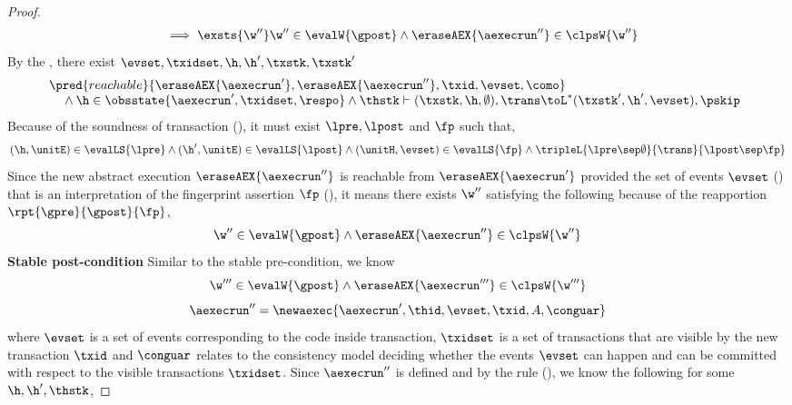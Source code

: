 \begin{proof}
\[\begin{array}{@{}l}
    \quad {} \implies \exsts{\w''} 
    \w'' \in \evalW{\gpost} 
    \land \eraseAEX{ \aexecrun'' } \in \clpsW{\w''}
\end{array}
\]
By the , there exist \( \evset,\txidset, \h, \h', \txstk, \txstk' \)
\begin{equation}
\label{equ:reachable}
\begin{array}{@{}l}
    \pred{reachable}{\eraseAEX{\aexecrun'}, \eraseAEX{\aexecrun''}, \txid, \evset, \como} \\
    \quad {} \land \h \in \obsstate{\aexecrun', \txidset, \respo} \land \thstk \vdash (\txstk, \h, \emptyset), \trans \toL^{*} (\txstk', \h', \evset ), \pskip
\end{array}
\end{equation}
Because of the soundness of transaction (), it must exist \( \lpre, \lpost \) and \( \fp \) such that,
\begin{equation}
\label{equ:local-transfer}
    (\h, \unitE) \in \evalLS{\lpre} 
    \land (\h', \unitE) \in \evalLS{\lpost} 
    \land (\unitH, \evset ) \in \evalLS{\fp}
    \land \tripleL{\lpre \sep \emptyset}{\trans}{\lpost \sep \fp}
\end{equation}
Since the new abstract execution \( \eraseAEX{\aexecrun''} \) is reachable from \( \eraseAEX{\aexecrun'} \) provided the set of events \( \evset \) () that is an interpretation of the fingerprint assertion \( \fp \) (), it means there exists \(  \w'' \) satisfying the following because of the reapportion  \( \rpt{ \gpre }{ \gpost }{ \fp }\),
\[
    \w'' \in \evalW{\gpost} 
    \land \eraseAEX{ \aexecrun'' } \in \clpsW{\w''}
\]
\textbf{Stable post-condition} Similar to the stable pre-condition, we know
\[
    \w''' \in \evalW{\gpost} 
    \land \eraseAEX{ \aexecrun''' } \in \clpsW{\w'''}
\]
\begin{equation}
    \label{equ:commit-new-transaction}
    \aexecrun'' = \newaexec{\aexecrun', \thid, \evset, \txid, A, \conguar } 
\end{equation}
where \( \evset \) is a set of events corresponding to the code inside transaction, \( \txidset \) is  a set of transactions that are visible by the new transaction \( \txid \) and \( \conguar \) relates to the consistency model deciding whether the events \( \evset \) can happen and can be committed with respect to the visible transactions \( \txidset \).
Since \( \aexecrun'' \) is defined and by the  rule (), we know the following for some \( \h, \h', \thstk \),

\end{proof}
